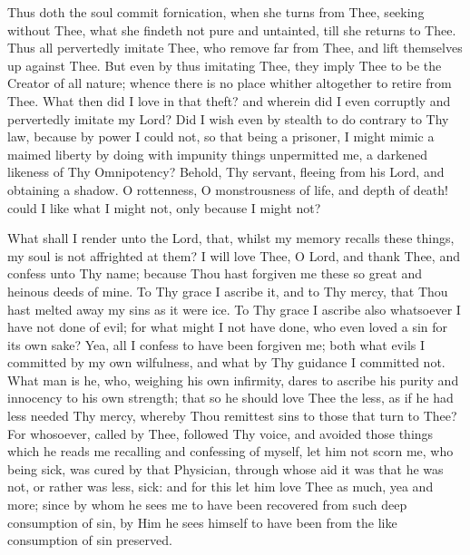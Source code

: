 \documentclass[b5paper,openright,12pt,twoside]{book}
\begin{document}
Thus doth the soul commit fornication, when she turns from Thee, seeking
without Thee, what she findeth not pure and untainted, till she returns
to Thee. Thus all pervertedly imitate Thee, who remove far from Thee,
and lift themselves up against Thee. But even by thus imitating Thee,
they imply Thee to be the Creator of all nature; whence there is no
place whither altogether to retire from Thee. What then did I love in
that theft? and wherein did I even corruptly and pervertedly imitate my
Lord? Did I wish even by stealth to do contrary to Thy law, because
by power I could not, so that being a prisoner, I might mimic a maimed
liberty by doing with impunity things unpermitted me, a darkened
likeness of Thy Omnipotency? Behold, Thy servant, fleeing from his Lord,
and obtaining a shadow. O rottenness, O monstrousness of life, and depth
of death! could I like what I might not, only because I might not?

What shall I render unto the Lord, that, whilst my memory recalls these
things, my soul is not affrighted at them? I will love Thee, O Lord,
and thank Thee, and confess unto Thy name; because Thou hast forgiven me
these so great and heinous deeds of mine. To Thy grace I ascribe it, and
to Thy mercy, that Thou hast melted away my sins as it were ice. To Thy
grace I ascribe also whatsoever I have not done of evil; for what might
I not have done, who even loved a sin for its own sake? Yea, all I
confess to have been forgiven me; both what evils I committed by my own
wilfulness, and what by Thy guidance I committed not. What man is
he, who, weighing his own infirmity, dares to ascribe his purity and
innocency to his own strength; that so he should love Thee the less, as
if he had less needed Thy mercy, whereby Thou remittest sins to those
that turn to Thee? For whosoever, called by Thee, followed Thy voice,
and avoided those things which he reads me recalling and confessing
of myself, let him not scorn me, who being sick, was cured by that
Physician, through whose aid it was that he was not, or rather was less,
sick: and for this let him love Thee as much, yea and more; since by
whom he sees me to have been recovered from such deep consumption of
sin, by Him he sees himself to have been from the like consumption of
sin preserved.
\end{document}
